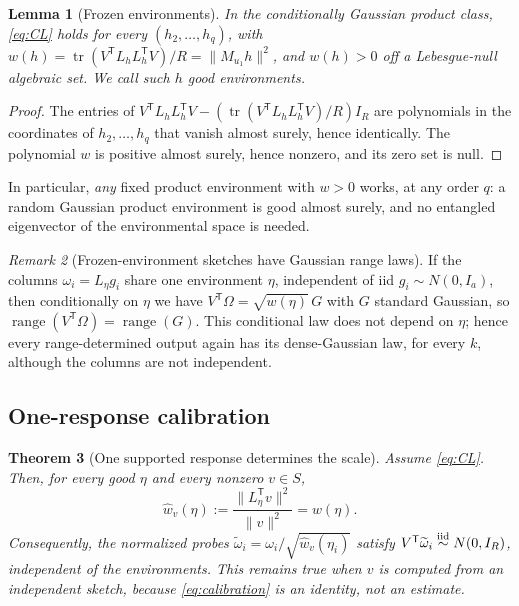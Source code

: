 \documentclass[11pt,a4paper]{article}
\newtheorem{theorem}{Theorem}[section]
\newtheorem{lemma}[theorem]{Lemma}
\theoremstyle{definition}
\theoremstyle{remark}
\newtheorem{remark}[theorem]{Remark}
\numberwithin{equation}{section}
\newcommand{\T}{{\mathsf T}}
\newcommand{\tr}{\operatorname{tr}}
\newcommand{\range}{\operatorname{range}}
\newcommand{\norm}[1]{\lVert#1\rVert}
\begin{document}
\begin{lemma}[Frozen environments]\label{lem:frozen}
In the conditionally Gaussian product class, \eqref{eq:CL} holds for
\emph{every} $(h_2,\ldots,h_q)$, with
$w(h)=\tr(V^\T L_hL_h^\T V)/R=\norm{M_{u_1}h}^2$, and $w(h)>0$ off a Lebesgue-null
algebraic set. We call such $h$ \emph{good environments}.
\end{lemma}

\begin{proof}
The entries of $V^\T L_hL_h^\T V-(\tr(V^\T L_hL_h^\T V)/R)I_R$ are polynomials in
the coordinates of $h_2,\ldots,h_q$ that vanish almost surely, hence
identically. The polynomial $w$ is positive almost surely, hence nonzero, and
its zero set is null.
\end{proof}

In particular, \emph{any} fixed product environment with $w>0$ works, at any
order $q$: a random Gaussian product environment is good almost surely, and no
entangled eigenvector of the environmental space is needed.

\begin{remark}[Frozen-environment sketches have Gaussian range laws]
\label{rem:frozen-range}
If the columns $\omega_i=L_\eta g_i$ share one environment $\eta$, independent
of iid $g_i\sim N(0,I_a)$, then conditionally on $\eta$ we have
$V^\T\Omega=\sqrt{w(\eta)}\,G$ with $G$ standard Gaussian, so
$\range(V^\T\Omega)=\range(G)$. This conditional law does not depend on $\eta$;
hence every range-determined output again has its dense-Gaussian law, for every
$k$, although the columns are not independent.
\end{remark}

\subsection{One-response calibration}

\begin{theorem}[One supported response determines the scale]\label{thm:calibration}
Assume \eqref{eq:CL}. Then, for every good $\eta$ and every nonzero $v\in S$,
\begin{equation}\label{eq:calibration}
 \widehat w_v(\eta):=\frac{\norm{L_\eta^\T v}^2}{\norm v^2}=w(\eta).
\end{equation}
Consequently, the normalized probes $\widetilde\omega_i=\omega_i/\sqrt{\widehat w_v(\eta_i)}$
satisfy $V^\T\widetilde\omega_i\overset{\rm iid}{\sim}N(0,I_R)$, independent of the
environments. This remains true when $v$ is computed from an independent
sketch, because \eqref{eq:calibration} is an identity, not an estimate.
\end{theorem}
\end{document}
